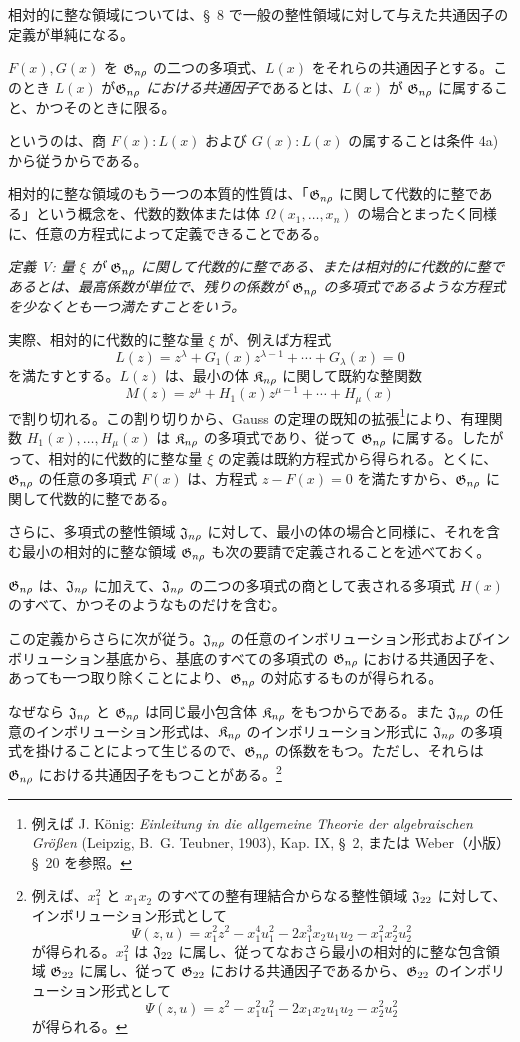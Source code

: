 \documentclass[11pt]{article}
\begin{document}
相対的に整な領域については、\S\ 8 で一般の整性領域に対して与えた共通因子の定義が単純になる。

$F(x),G(x)$ を $\mathfrak{G}_{n\rho}$ の二つの多項式、$L(x)$ をそれらの共通因子とする。このとき $L(x)$ が\emph{$\mathfrak{G}_{n\rho}$ における共通因子}であるとは、$L(x)$ が $\mathfrak{G}_{n\rho}$ に属すること、かつそのときに限る。

というのは、商 $F(x):L(x)$ および $G(x):L(x)$ の属することは条件 4a) から従うからである。

相対的に整な領域のもう一つの本質的性質は、「$\mathfrak{G}_{n\rho}$ に関して代数的に整である」という概念を、代数的数体または体 $\Omega(x_1,\ldots,x_n)$ の場合とまったく同様に、任意の方程式によって定義できることである。

\emph{定義 V: 量 $\xi$ が $\mathfrak{G}_{n\rho}$ に関して代数的に整である、または相対的に代数的に整であるとは、最高係数が単位で、残りの係数が $\mathfrak{G}_{n\rho}$ の多項式であるような方程式を少なくとも一つ満たすことをいう。}

実際、相対的に代数的に整な量 $\xi$ が、例えば方程式
\[
  L(z)=z^\lambda+G_1(x)z^{\lambda-1}+\cdots+G_\lambda(x)=0
\]
を満たすとする。$L(z)$ は、最小の体 $\mathfrak{K}_{n\rho}$ に関して既約な整関数
\[
  M(z)=z^\mu+H_1(x)z^{\mu-1}+\cdots+H_\mu(x)
\]
で割り切れる。この割り切りから、Gauss の定理の既知の拡張\footnote{例えば J. König: \emph{Einleitung in die allgemeine Theorie der algebraischen Größen} (Leipzig, B.~G. Teubner, 1903), Kap. IX, \S\ 2, または Weber（小版）\S\ 20 を参照。}により、有理関数 $H_1(x),\ldots,H_\mu(x)$ は $\mathfrak{K}_{n\rho}$ の多項式であり、従って $\mathfrak{G}_{n\rho}$ に属する。したがって、相対的に代数的に整な量 $\xi$ の定義は既約方程式から得られる。とくに、$\mathfrak{G}_{n\rho}$ の任意の多項式 $F(x)$ は、方程式 $z-F(x)=0$ を満たすから、$\mathfrak{G}_{n\rho}$ に関して代数的に整である。

さらに、多項式の整性領域 $\mathfrak{J}_{n\rho}$ に対して、最小の体の場合と同様に、それを含む最小の相対的に整な領域 $\mathfrak{G}_{n\rho}$ も次の要請で定義されることを述べておく。

$\mathfrak{G}_{n\rho}$ は、$\mathfrak{J}_{n\rho}$ に加えて、$\mathfrak{J}_{n\rho}$ の二つの多項式の商として表される多項式 $H(x)$ のすべて、かつそのようなものだけを含む。

この定義からさらに次が従う。$\mathfrak{J}_{n\rho}$ の任意のインボリューション形式およびインボリューション基底から、基底のすべての多項式の $\mathfrak{G}_{n\rho}$ における共通因子を、あっても一つ取り除くことにより、$\mathfrak{G}_{n\rho}$ の対応するものが得られる。

なぜなら $\mathfrak{J}_{n\rho}$ と $\mathfrak{G}_{n\rho}$ は同じ最小包含体 $\mathfrak{K}_{n\rho}$ をもつからである。また $\mathfrak{J}_{n\rho}$ の任意のインボリューション形式は、$\mathfrak{K}_{n\rho}$ のインボリューション形式に $\mathfrak{J}_{n\rho}$ の多項式を掛けることによって生じるので、$\mathfrak{G}_{n\rho}$ の係数をもつ。ただし、それらは $\mathfrak{G}_{n\rho}$ における共通因子をもつことがある。\footnote{例えば、$x_1^2$ と $x_1x_2$ のすべての整有理結合からなる整性領域 $\mathfrak{J}_{22}$ に対して、インボリューション形式として
\[
\Psi(z,u)=x_1^2z^2-x_1^4u_1^2-2x_1^3x_2u_1u_2-x_1^2x_2^2u_2^2
\]
が得られる。$x_1^2$ は $\mathfrak{J}_{22}$ に属し、従ってなおさら最小の相対的に整な包含領域 $\mathfrak{G}_{22}$ に属し、従って $\mathfrak{G}_{22}$ における共通因子であるから、$\mathfrak{G}_{22}$ のインボリューション形式として
\[
\Psi(z,u)=z^2-x_1^2u_1^2-2x_1x_2u_1u_2-x_2^2u_2^2
\]
が得られる。}
\end{document}
